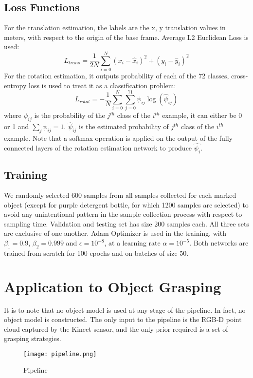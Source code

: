 \documentclass[conference]{IEEEtran}
\begin{document}
\subsection{Loss Functions}
For the translation estimation, the labels are the x, y translation values in meters, with respect to the origin of the base frame. Average L2 Euclidean Loss is used:
$$L_{trans} = \frac{1}{2N}\sum_{i=0}^{N}
(x_{i} - \hat{x}_{i})^{2} + (y_{i} - \hat{y}_{i})^{2}$$
For the rotation estimation, it outputs probability of each of the 72 classes, cross-entropy loss is used to treat it as a classification problem:
$$L_{rotat} = - \frac{1}{N}\sum_{i=0}^{N}\sum_{j=0}^{71}\psi_{ij}\log(\hat{\psi}_{ij})$$
where $\psi_{ij}$ is the probability of the $j^{th}$ class of the $i^{th}$ example, it can either be 0 or 1 and $\sum_{j}\psi_{ij} = 1$. $\hat{\psi}_{ij}$ is the estimated probability of $j^{th}$ class of the $i^{th}$ example. Note that a softmax operation is applied on the output of the fully connected layers of the rotation estimation network to produce $\hat{\psi_{i}}$.

\subsection{Training}
We randomly selected 600 samples from all samples collected for each marked object (except for purple detergent bottle, for which 1200 samples are selected) to avoid any unintentional pattern in the sample collection process with respect to sampling time. Validation and testing set has size 200 samples each. All three sets are exclusive of one another.
Adam Optimizer is used in the training, with $\beta_{1} = 0.9$, $\beta_{2} = 0.999$ and $\epsilon = 10^{-8}$, at a learning rate $\alpha = 10^{-5}$. Both networks are trained from scratch for 100 epochs and on batches of size 50.

\section{Application to Object Grasping}
It is to note that no object model is used at any stage of the pipeline. In fact, no object model is constructed. The only input to the pipeline is the RGB-D point cloud captured by the Kinect sensor, and the only prior required is a set of grasping strategies.

\begin{figure}[htbp]
 \centerline{\texttt{[image: pipeline.png]}}
 \caption{Pipeline}
 \label{fig_pipeline}
\end{figure}
\end{document}
